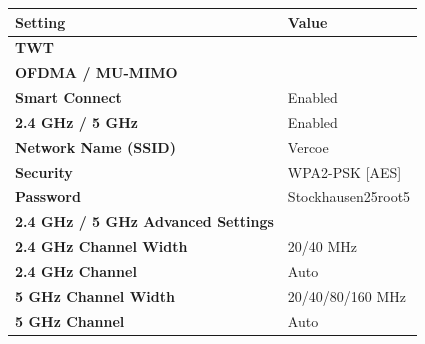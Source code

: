 \documentclass[10pt,a4paper]{article}
\newcommand{\checkbox}{%
  \raisebox{0.1ex}{\fbox{\rule{0pt}{1.05ex}\rule{1.05ex}{0pt}}}%
}
\begin{document}
\begin{tabularx}{\textwidth}{@{} p{} Y @{}}
\toprule
{}
\textbf{Setting} & \textbf{Value} \\
\midrule
\textbf{TWT} & \checkbox{} \\
\textbf{OFDMA / MU-MIMO} & \checkbox{} \\
\textbf{Smart Connect} & Enabled \\
\textbf{2.4 GHz / 5 GHz} & Enabled \\
\textbf{Network Name (SSID)} & Vercoe \\
\textbf{Security} & WPA2-PSK [AES] \\
\textbf{Password} & Stockhausen25root5 \\
\textbf{2.4 GHz / 5 GHz Advanced Settings} & {} \\
\textbf{2.4 GHz Channel Width} & 20/40 MHz \\
\textbf{2.4 GHz Channel} & Auto \\
\textbf{5 GHz Channel Width} & 20/40/80/160 MHz \\
\textbf{5 GHz Channel} & Auto \\
\bottomrule
\end{tabularx}
\end{document}
